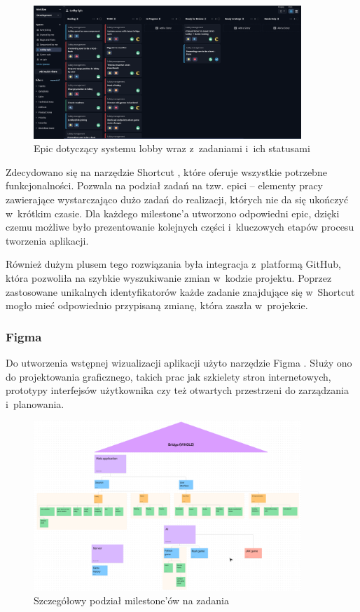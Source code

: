 \begin{figure}[h!]
    \centering
    \includegraphics[width=0.9\textwidth]{img/shortcut/shortcut_epic.png}
    \caption{Epic dotyczący systemu lobby wraz z~zadaniami i~ich statusami}
\end{figure}

Zdecydowano się na narzędzie Shortcut \cite{Shortcut}, które oferuje
wszystkie potrzebne funkcjonalności. Pozwala na podział zadań na tzw.
epici -- elementy pracy zawierające wystarczająco dużo zadań do realizacji,
których nie da się ukończyć w~krótkim czasie. Dla każdego milestone'a
utworzono odpowiedni epic, dzięki czemu możliwe było prezentowanie
kolejnych części i~kluczowych etapów procesu tworzenia aplikacji.

\FloatBarrier

Również dużym plusem tego rozwiązania była integracja
z~platformą GitHub\cite{Github}, która pozwoliła na
szybkie wyszukiwanie zmian w~kodzie projektu. Poprzez
zastosowane unikalnych identyfikatorów każde zadanie
znajdujące się w~Shortcut mogło mieć odpowiednio przypisaną
zmianę, która zaszła w~projekcie.


\subsubsection{Figma}

Do utworzenia wstępnej wizualizacji aplikacji użyto narzędzie Figma \cite{Figma}.
Służy ono do projektowania graficznego, takich prac jak szkielety stron
internetowych, prototypy interfejsów użytkownika czy też otwartych przestrzeni
do zarządzania i~planowania.

\begin{figure}[h!]
    \centering
    \includegraphics[width=0.9\textwidth]{img/schematy/milestones.png}
    \caption{Szczegółowy podział milestone'ów na zadania}
\end{figure}

